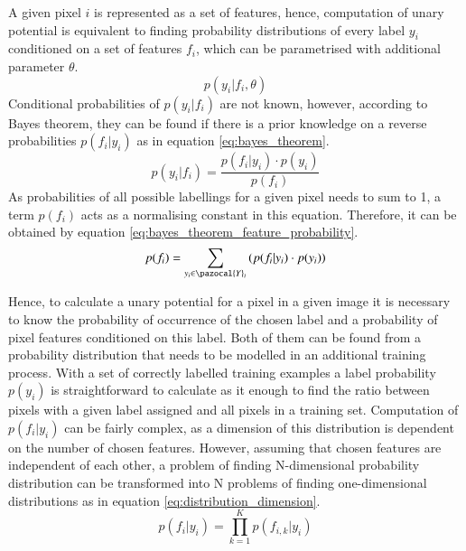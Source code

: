A given pixel $i$ is represented as a set of features, hence, computation of unary potential is equivalent to finding probability distributions of every label $y_i$ conditioned on a set of features $f_i$, which can be parametrised with additional parameter $\theta$. 
\begin{equation}
p(y_i | f_i, \theta)
\end{equation}
Conditional probabilities of $p(y_i | f_i)$ are not known, however, according to Bayes theorem, they can be found if there is a prior knowledge on a reverse probabilities $p(f_i | y_i)$ as in equation \ref{eq:bayes_theorem}.
\begin{equation}
    \label{eq:bayes_theorem}
    p(y_i | f_i) = \frac{p(f_i | y_i) \cdot p(y_i)}{p(f_i)}
\end{equation}
As probabilities of all possible labellings for a given pixel needs to sum to 1, a term $p(f_i)$ acts as a normalising constant in this equation. Therefore, it can be obtained by equation \ref{eq:bayes_theorem_feature_probability}.
\begin{equation}
    \label{eq:bayes_theorem_feature_probability}
    p(f_i) = \sum_{y_i \in \pazocal{Y}_i}{(p(f_i | y_i) \cdot p(y_i))} 
\end{equation}

Hence, to calculate a unary potential for a pixel in a given image it is necessary to know the probability of occurrence of the chosen label and a probability of pixel features conditioned on this label. Both of them can be found from a probability distribution that needs to be modelled in an additional training process. With a set of correctly labelled training examples a label probability $p(y_i)$ is straightforward to calculate as it enough to find the ratio between pixels with a given label assigned and all pixels in a training set. Computation of $p(f_i | y_i)$ can be fairly complex, as a dimension of this distribution is dependent on the number of chosen features. However, assuming that chosen features are independent of each other, a problem of finding N-dimensional probability distribution can be transformed into N problems of finding one-dimensional distributions as in equation \ref{eq:distribution_dimension}.
\begin{equation}
    \label{eq:distribution_dimension}
    p(f_i|y_i) = \prod_{k=1}^{K}p(f_{i,k}|y_i)
\end{equation}

